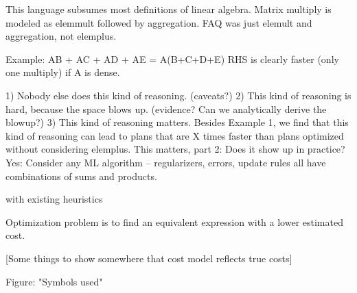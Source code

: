 
This language subsumes most definitions of linear algebra.   Matrix multiply is modeled as elemmult followed by aggregation.   FAQ was just elemult and aggregation, not elemplus. 

Example: AB + AC + AD + AE = A(B+C+D+E)   RHS is clearly faster (only one multiply) if A is dense.

1) Nobody else does this kind of reasoning.  (caveats?)
2) This kind of reasoning is hard, because the space blows up.  (evidence?  Can we analytically derive the blowup?)
3) This kind of reasoning matters.  Besides Example 1, we find that this kind of reasoning can lead to plans that are X times faster than plans optimized without considering elemplus.  This matters, part 2: Does it show up in practice?  Yes: Consider any ML algorithm -- regularizers, errors, update rules all have combinations of sums and products.

with existing heuristics

Optimization problem is to find an equivalent expression with a lower estimated cost.

[Some things to show somewhere that cost model reflects true costs]

Figure: "Symbols used"






